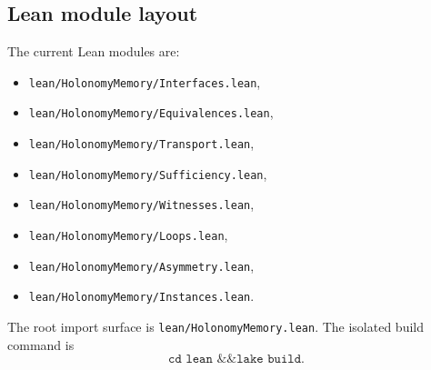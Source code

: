 \documentclass[11pt]{article}
\theoremstyle{definition}
\begin{document}
\subsection{Lean module layout}\label{appsubsec:lean-layout}
The current Lean modules are:
\begin{itemize}
\item \texttt{lean/HolonomyMemory/Interfaces.lean},
\item \texttt{lean/HolonomyMemory/Equivalences.lean},
\item \texttt{lean/HolonomyMemory/Transport.lean},
\item \texttt{lean/HolonomyMemory/Sufficiency.lean},
\item \texttt{lean/HolonomyMemory/Witnesses.lean},
\item \texttt{lean/HolonomyMemory/Loops.lean},
\item \texttt{lean/HolonomyMemory/Asymmetry.lean},
\item \texttt{lean/HolonomyMemory/Instances.lean}.
\end{itemize}
The root import surface is \texttt{lean/HolonomyMemory.lean}. The isolated build command is
\[
\texttt{cd lean \&\& lake build}.
\]
\end{document}
